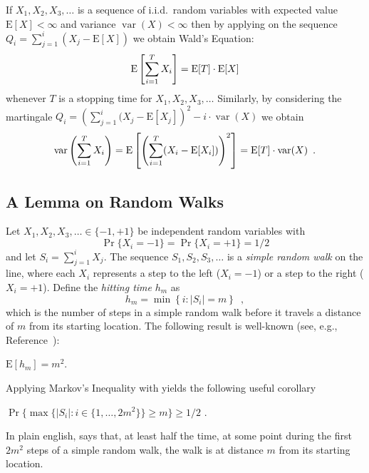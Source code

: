 \documentclass[lotsofwhite]{patmorin}
\newcommand{\E}{\mathrm{E}}
\DeclareMathOperator{\var}{var}
\begin{document}
If $X_1,X_2,X_3,\ldots$ is a sequence of i.i.d.\ random variables with
expected value $\E[X]<\infty$ and variance $\var(X)<\infty$ then by applying
 on the sequence $Q_i=\sum_{j=1}^i(X_j-\E[X])$ we
obtain Wald's Equation:
\begin{equation}
    \E\left[\sum_{i=1}^T X_i \right] = \E[T]\cdot\E[X] \eqlabel{wald-1}
\end{equation}
whenever $T$ is a stopping time for $X_1,X_2,X_3,\ldots$  Similarly,
by considering the martingale $Q_i=\left(\sum_{j=1}^i
(X_j-\E[X_j]\right)^2 - i\cdot\var(X)$ we obtain
\begin{equation}
    \var\left(\sum_{i=1}^T X_i\right) = \E\left[\left(\sum_{i=1}^T (X_i-\E[X_i])\right)^2 \right] =
\E[T]\cdot\var(X) \enspace . \eqlabel{wald-2}
\end{equation}


\subsection{A Lemma on Random Walks}

Let $X_1,X_2,X_3,\ldots\in\{-1,+1\}$ be independent random variables with
\[ \Pr\{X_i=-1\}=\Pr\{X_i=+1\}=1/2
\]
and let $S_i=\sum_{j=1}^i X_j$.  The sequence $S_1,S_2,S_3,\ldots$ is
a \emph{simple random walk} on the line, where each $X_i$ represents a
step to the left ($X_i=-1$) or a step to the right ($X_i=+1$).
Define the \emph{hitting time} $h_m$ as
\[
   h_m = \min\left\{i:|S_i|= m\right\} \enspace ,
\]
which is the number of steps in a simple random walk
before it travels a distance of $m$ from its starting location.
The following result is well-known (see, e.g.,
Reference~\cite{mu05}):
\begin{lem}
$\E[h_m] = m^2$.
\end{lem}
Applying Markov's Inequality with  yields the
following useful corollary
\begin{cor}
$\Pr\{\max\{|S_i|:i\in\{1,\ldots,2m^2\}\} \ge m\} \ge 1/2$ .
\end{cor}
In plain english,  says that, at least half the
time, at some point
during the first $2m^2$ steps of a simple random walk, the 
walk is at distance $m$ from its starting
location.
\end{document}
